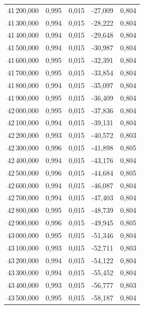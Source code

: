 \begin{longtable}{rrrrr}
41\,200,000 & 0,995 & 0,015 & -27,009 & 0,804\\
41\,300,000 & 0,994 & 0,015 & -28,222 & 0,804\\
41\,400,000 & 0,994 & 0,015 & -29,648 & 0,804\\
41\,500,000 & 0,994 & 0,015 & -30,987 & 0,804\\
41\,600,000 & 0,995 & 0,015 & -32,391 & 0,804\\
41\,700,000 & 0,995 & 0,015 & -33,854 & 0,804\\
41\,800,000 & 0,994 & 0,015 & -35,097 & 0,804\\
41\,900,000 & 0,995 & 0,015 & -36,409 & 0,804\\
42\,000,000 & 0,995 & 0,015 & -37,836 & 0,804\\
42\,100,000 & 0,994 & 0,015 & -39,131 & 0,804\\
42\,200,000 & 0,993 & 0,015 & -40,572 & 0,803\\
42\,300,000 & 0,996 & 0,015 & -41,898 & 0,805\\
42\,400,000 & 0,994 & 0,015 & -43,176 & 0,804\\
42\,500,000 & 0,996 & 0,015 & -44,684 & 0,805\\
42\,600,000 & 0,994 & 0,015 & -46,087 & 0,804\\
42\,700,000 & 0,994 & 0,015 & -47,403 & 0,804\\
42\,800,000 & 0,995 & 0,015 & -48,739 & 0,804\\
42\,900,000 & 0,996 & 0,015 & -49,945 & 0,805\\
43\,000,000 & 0,995 & 0,015 & -51,346 & 0,804\\
43\,100,000 & 0,993 & 0,015 & -52,711 & 0,803\\
43\,200,000 & 0,994 & 0,015 & -54,122 & 0,804\\
43\,300,000 & 0,994 & 0,015 & -55,452 & 0,804\\
43\,400,000 & 0,993 & 0,015 & -56,777 & 0,803\\
43\,500,000 & 0,995 & 0,015 & -58,187 & 0,804\\
\end{longtable}
